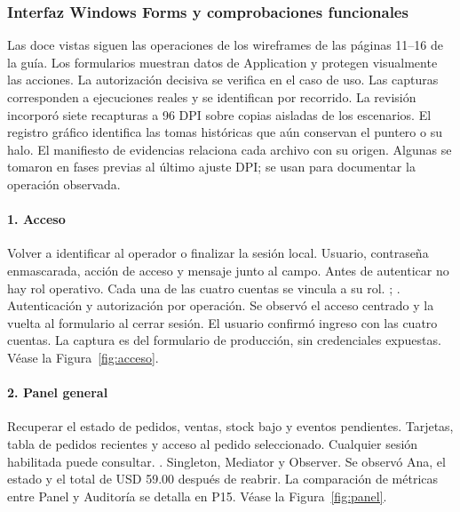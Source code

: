 \clearpage
\subsubsection{Interfaz Windows Forms y comprobaciones funcionales}
Las doce vistas siguen las operaciones de los wireframes de las páginas 11--16 de la guía. Los formularios muestran datos de Application y protegen visualmente las acciones. La autorización decisiva se verifica en el caso de uso. Las capturas corresponden a ejecuciones reales y se identifican por recorrido. La revisión incorporó siete recapturas a 96 DPI sobre copias aisladas de los escenarios. El registro gráfico identifica las tomas históricas que aún conservan el puntero o su halo. El manifiesto de evidencias relaciona cada archivo con su origen. Algunas se tomaron en fases previas al último ajuste DPI; se usan para documentar la operación observada.

\paragraph{1. Acceso}
 Volver a identificar al operador o finalizar la sesión local.
 Usuario, contraseña enmascarada, acción de acceso y mensaje junto al campo.
 Antes de autenticar no hay rol operativo. Cada una de las cuatro cuentas se vincula a su rol.
 ; .
 Autenticación y autorización por operación.
 Se observó el acceso centrado y la vuelta al formulario al cerrar sesión. El usuario confirmó ingreso con las cuatro cuentas. La captura es del formulario de producción, sin credenciales expuestas. Véase la Figura~\ref{fig:acceso}.

\clearpage
\paragraph{2. Panel general}
 Recuperar el estado de pedidos, ventas, stock bajo y eventos pendientes.
 Tarjetas, tabla de pedidos recientes y acceso al pedido seleccionado.
 Cualquier sesión habilitada puede consultar.
 .
 Singleton, Mediator y Observer.
 Se observó Ana, el estado y el total de USD 59.00 después de reabrir. La comparación de métricas entre Panel y Auditoría se detalla en P15. Véase la Figura~\ref{fig:panel}.

